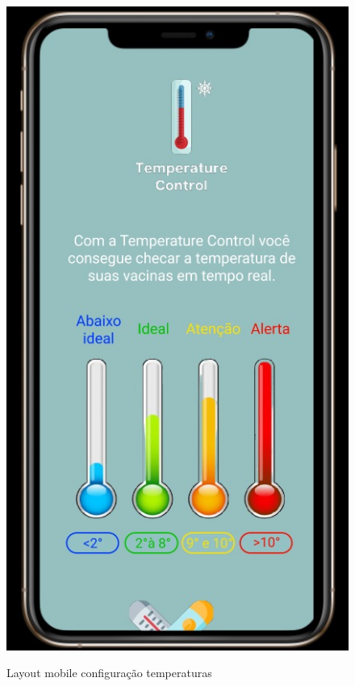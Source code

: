 \documentclass[hidelinks, 12pt, a4paper, brazil, oneside]{abntex2}
\begin{document}
    \begin{figure}[ht]
        \caption{Layout mobile configuração temperaturas}
        \centering
        \includegraphics[scale=0.5]{img/mobile/config_temp.jpeg}
        \label{fig:mobileConfig}
    \end{figure}
\end{document}
